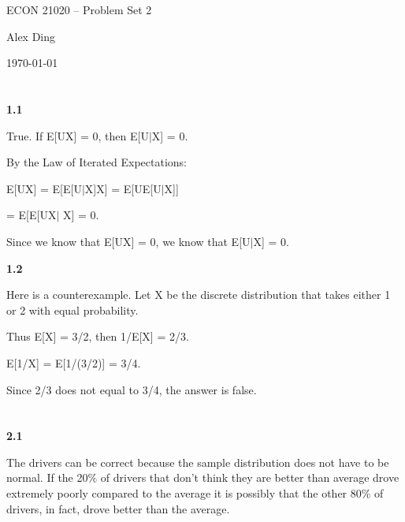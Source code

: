 



{\LARGE \centering ECON 21020 -- Problem Set 2\par}
{\vspace{-1em} \large \centering Alex Ding \par}
{\centering \vspace{-1em} \today \par }

\section{}
\textbf{1.1}

True. If E[UX] = 0, then E[U$\mid$X] = 0.

By the Law of Iterated Expectations:

E[UX] = E[E[U$\mid$X]X] = E[UE[U$\mid$X]] 

= E[E[UX$\mid$ X] = 0.

Since we know that E[UX] = 0, we know that E[U$\mid$X] = 0.

\textbf{1.2}

Here is a counterexample.
Let X be the discrete distribution that takes either 1 or 2 with equal probability.

Thus E[X] = 3/2, then 1/E[X] = 2/3.

E[1/X] = E[1/(3/2)] = 3/4.

Since 2/3 does not equal to 3/4, the answer is false.


\section{}

\textbf{2.1}

The drivers can be correct because the sample distribution does not have to be normal. If the 20$\%$ of drivers that don't think they are better than average drove extremely poorly compared to the average it is possibly that the other 80$\%$ of drivers, in fact, drove better than the average.

\section{}

